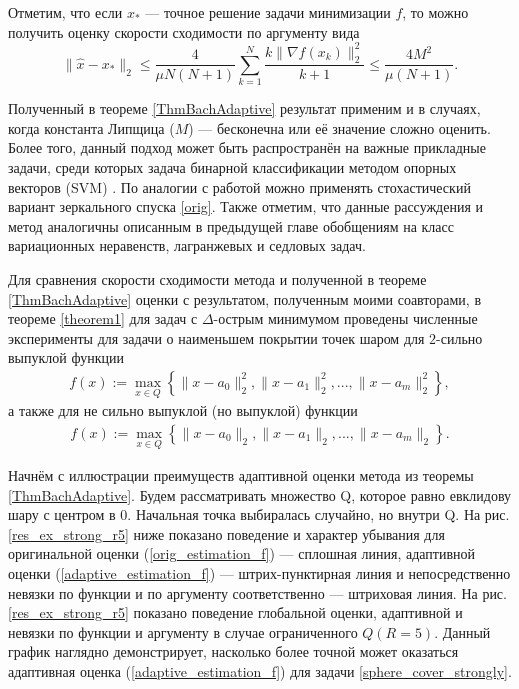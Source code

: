     Отметим, что если $x_*$ --- точное решение задачи минимизации $f$, то можно получить оценку скорости сходимости по аргументу вида
    \begin{equation} \label{arg_est}
        \|\widehat{x} - x_*\|_2 \leq \frac{4}{\mu N (N+1)} \sum_{k=1}^{N} \frac{k \|\nabla f(x_k)\|_2^2}{k+1} \leq \frac{4M^2}{\mu(N+1)}.
    \end{equation}

    Полученный в теореме \ref{ThmBachAdaptive} результат применим и в случаях, когда константа Липщица ($M$) --- бесконечна или её значение сложно оценить. Более того, данный подход может быть распространён на важные прикладные задачи, среди которых задача бинарной классификации методом опорных векторов (SVM) \cite{Bach_2012}. По аналогии с работой \cite{Bach_2012} можно применять стохастический вариант зеркального спуска \eqref{orig}. Также отметим, что данные рассуждения и метод аналогичны описанным в предыдущей главе обобщениям на класс вариационных неравенств, лагранжевых и седловых задач. 

    Для сравнения скорости сходимости метода \cite{Bach_2012} и полученной в теореме \ref{ThmBachAdaptive} оценки с результатом, полученным моими соавторами, в теореме \ref{theorem1} для задач с $\Delta$-острым минимумом проведены численные эксперименты для задачи о наименьшем покрытии точек шаром для $2$-сильно выпуклой функции
    \begin{gather}\label{sphere_cover_strongly}
        f(x) := \max_{x\in Q}\left\{\|x - a_0\|_2^2, \|x - a_1\|_2^2, ..., \|x - a_m\|_2^2\right\},
    \end{gather}
    а также для не сильно выпуклой (но выпуклой) функции
    \begin{gather}\label{sphere_cover}
        f(x) := \max_{x\in Q}\left\{\|x - a_0\|_2, \|x - a_1\|_2, ..., \|x - a_m\|_2\right\}.
    \end{gather}

    Начнём с иллюстрации преимуществ адаптивной оценки метода \cite{Bach_2012} из теоремы \ref{ThmBachAdaptive}. Будем рассматривать множество Q, которое равно евклидову шару с центром в 0. Начальная точка выбиралась случайно, но внутри Q. На рис. \ref{res_ex_strong_r5} ниже показано поведение и характер убывания для оригинальной оценки (\ref{orig_estimation_f}) --- сплошная линия, адаптивной оценки (\ref{adaptive_estimation_f}) --- штрих-пунктирная линия и непосредственно невязки по функции и по аргументу соответственно --- штриховая линия. На рис. \ref{res_ex_strong_r5} показано поведение глобальной оценки, адаптивной и невязки по функции и аргументу в случае ограниченного $Q (R = 5)$. Данный график наглядно демонстрирует, насколько более точной может оказаться адаптивная оценка (\ref{adaptive_estimation_f}) для задачи \eqref{sphere_cover_strongly}. 

